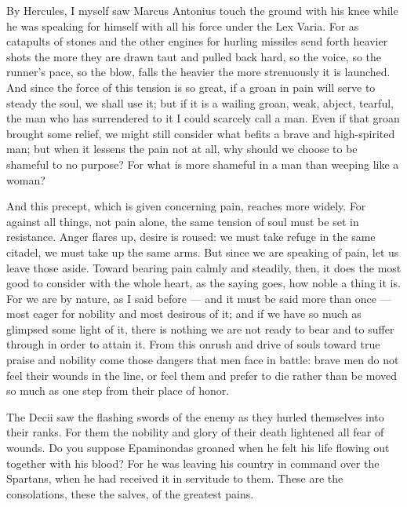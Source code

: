  By Hercules, I myself saw Marcus Antonius touch the ground with his knee while he was speaking for himself with all his force under the Lex Varia. For as catapults of stones and the other engines for hurling missiles send forth heavier shots the more they are drawn taut and pulled back hard, so the voice, so the runner's pace, so the blow, falls the heavier the more strenuously it is launched. And since the force of this tension is so great, if a groan in pain will serve to steady the soul, we shall use it; but if it is a wailing groan, weak, abject, tearful, the man who has surrendered to it I could scarcely call a man. Even if that groan brought some relief, we might still consider what befits a brave and high-spirited man; but when it lessens the pain not at all, why should we choose to be shameful to no purpose? For what is more shameful in a man than weeping like a woman?

 And this precept, which is given concerning pain, reaches more widely. For against all things, not pain alone, the same tension of soul must be set in resistance. Anger flares up, desire is roused: we must take refuge in the same citadel, we must take up the same arms. But since we are speaking of pain, let us leave those aside. Toward bearing pain calmly and steadily, then, it does the most good to consider with the whole heart, as the saying goes, how noble a thing it is. For we are by nature, as I said before — and it must be said more than once — most eager for nobility and most desirous of it; and if we have so much as glimpsed some light of it, there is nothing we are not ready to bear and to suffer through in order to attain it. From this onrush and drive of souls toward true praise and nobility come those dangers that men face in battle: brave men do not feel their wounds in the line, or feel them and prefer to die rather than be moved so much as one step from their place of honor.

 The Decii saw the flashing swords of the enemy as they hurled themselves into their ranks. For them the nobility and glory of their death lightened all fear of wounds. Do you suppose Epaminondas groaned when he felt his life flowing out together with his blood? For he was leaving his country in command over the Spartans, when he had received it in servitude to them. These are the consolations, these the salves, of the greatest pains.


